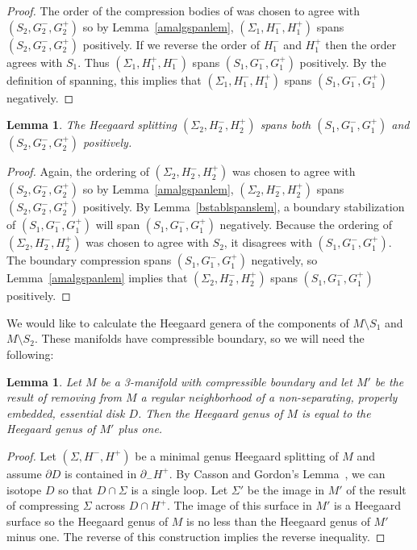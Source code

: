 \documentclass[12pt]{amsart}
\theoremstyle{plain}
\newtheorem{Lem}[Thm]{Lemma}
\theoremstyle{definition}
\begin{document}
\begin{proof}
The order of the compression bodies of was chosen to agree with $(S_2, G^-_2, G^+_2)$ so by Lemma~\ref{amalgspanlem}, $(\Sigma_1, H^-_1, H^+_1)$ spans $(S_2, G^-_2, G^+_2)$ positively.   If we reverse the order of $H^-_1$ and $H^+_1$ then the order agrees with $S_1$.  Thus $(\Sigma_1, H^+_1, H^-_1)$ spans $(S_1, G^-_1, G^+_1)$ positively.  By the definition of spanning, this implies that $(\Sigma_1, H^-_1, H^+_1)$ spans $(S_1, G^-_1, G^+_1)$ negatively.
\end{proof}

\begin{Lem}
The Heegaard splitting $(\Sigma_2, H^-_2, H^+_2)$ spans both $(S_1, G^-_1, G^+_1)$ and $(S_2, G^-_2, G^+_2)$ positively.
\end{Lem}

\begin{proof}
Again, the ordering of $(\Sigma_2, H^-_2, H^+_2)$ was chosen to agree with $(S_2, G^-_2, G^+_2)$ so by Lemma~\ref{amalgspanlem}, $(\Sigma_2, H^-_2, H^+_2)$ spans  $(S_2, G^-_2, G^+_2)$ positively.  By Lemma~\ref{bstablspanslem}, a boundary stabilization of $(S_1, G^-_1, G^+_1)$ will span $(S_1, G^-_1, G^+_1)$ negatively.  Because the ordering of $(\Sigma_2, H^-_2, H^+_2)$ was chosen to agree with $S_2$, it disagrees with $(S_1, G^-_1, G^+_1)$.  The boundary compression spans $(S_1, G^-_1, G^+_1)$ negatively, so Lemma~\ref{amalgspanlem} implies that $(\Sigma_2, H^-_2, H^+_2)$ spans $(S_1, G^-_1, G^+_1)$ positively.
\end{proof}

We would like to calculate the Heegaard genera of the components of $M \setminus S_1$ and $M \setminus S_2$.  These manifolds have compressible boundary, so we will need the following:

\begin{Lem}
\label{compressgenuslem}
Let $M$ be a 3-manifold with compressible boundary and let $M'$ be the result of removing from $M$ a regular neighborhood of a non-separating, properly embedded, essential disk $D$.  Then the Heegaard genus of $M$ is equal to the Heegaard genus of $M'$ plus one.
\end{Lem}

\begin{proof}
Let $(\Sigma, H^-, H^+)$ be a minimal genus Heegaard splitting of $M$ and assume $\partial D$ is contained in $\partial_- H^+$.  By Casson and Gordon's Lemma~\cite{cass:red}, we can isotope $D$ so that $D \cap \Sigma$ is a single loop.  Let $\Sigma'$ be the image in $M'$ of the result of compressing $\Sigma$ across $D \cap H^+$.  The image of this surface in $M'$ is a Heegaard surface so the Heegaard genus of $M$ is no less than the Heegaard genus of $M'$ minus one.  The reverse of this construction implies the reverse inequality.
\end{proof}
\end{document}
